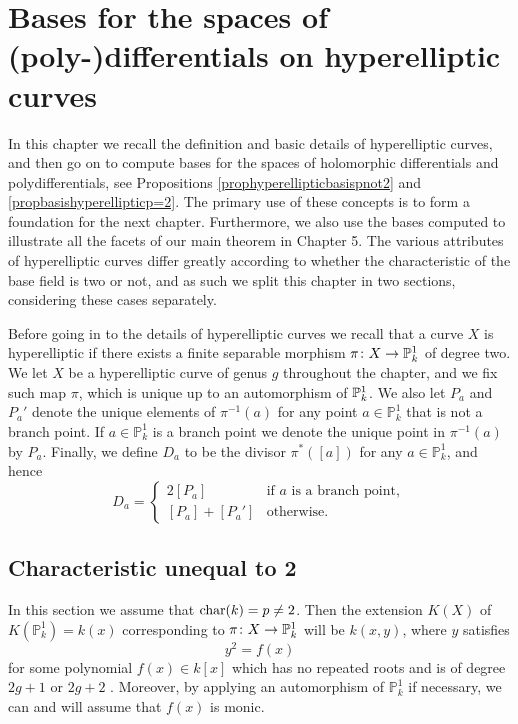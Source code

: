 \chapter{Bases for the spaces of (poly-)differentials on hyperelliptic curves} \label{chapterhyperellipticcurves}


In this chapter we recall the definition and basic details of hyperelliptic curves, and then go on to compute bases for the spaces of holomorphic differentials and polydifferentials, see Propositions \ref{prophyperellipticbasispnot2} and \ref{propbasishyperellipticp=2}.
The primary use of these concepts is to form a foundation for the next chapter.
Furthermore, we also use the bases computed to illustrate all the facets of our main theorem in Chapter 5.
The various attributes of hyperelliptic curves differ greatly according to whether the characteristic of the base field is two or not, and as such we split this chapter in two sections, considering these cases separately.


Before going in to the details of hyperelliptic curves we recall that a curve $X$ is hyperelliptic if there exists a finite separable morphism $\pi \colon X \rightarrow {\mathbb P}_k^1$ of degree two.
We let $X$ be a hyperelliptic curve of genus $g$ throughout the chapter, and we fix such map $\pi$, which is unique up to an automorphism of ${\mathbb P}_k^1$.
We also let $P_a$ and $P_a'$ denote the unique elements of $\pi^{-1}(a)$ for any point $a \in \mathbb P_k^1$ that is not a branch point.
If $a \in \mathbb P_k^1$ is a branch point we denote the unique point in $\pi^{-1}(a)$ by $P_a$.
Finally, we define $D_a$ to be the divisor $\pi^*\left([a]\right)$ for any $a \in \mathbb P_k^1$, and hence
    \begin{equation*}
    D_a= 
        \begin{cases}
         2[P_a] & \text{if $a$ is a branch point}, \\
         [P_a] + [P_a'] & \text{otherwise.}
        \end{cases}
    \end{equation*}

\section{Characteristic unequal to 2}\label{charneq2}

In this section we assume that $\operatorname{char}(k) = p \neq 2$.
Then the extension $K(X)$ of $K(\mathbb P_k^1) = k(x)$ corresponding to $ \pi \colon X \rightarrow \mathbb P_k^1$ will be $k(x,y)$, where $y$ satisfies
    \begin{equation}\label{equationdefiningequationpnot2}
    y^2 = f(x)
    \end{equation}
for some polynomial $f(x) \in k[x]$ which has no repeated roots and is of degree $2g+1$ or $2g+2$ \cite[Prop.\ 7.4.24]{liu}.
Moreover, by applying an automorphism of $\mathbb P_k^1$ if necessary, we can and will assume that $f(x)$ is monic.

